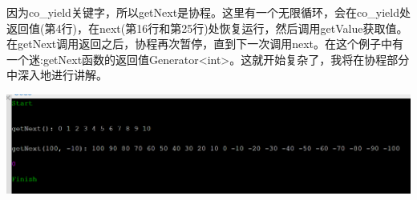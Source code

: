 因为co\_yield关键字，所以getNext是协程。这里有一个无限循环，会在co\_yield处返回值(第4行)，在next(第16行和第25行)处恢复运行，然后调用getValue获取值。在getNext调用返回之后，协程再次暂停，直到下一次调用next。在这个例子中有一个迷:getNext函数的返回值Generator<int>。这就开始复杂了，我将在协程部分中深入地进行讲解。

\begin{center}
\includegraphics[width=1.0\textwidth]{content/2/chapter3/images/3.png}\\
\end{center}















